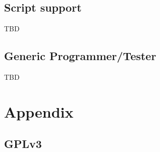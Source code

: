 \documentclass[a4paper,12pt]{book}
\begin{document}
\newpage
\section{Script support}
TBD

\newpage
\section{Generic Programmer/Tester}
TBD

\chapter{Appendix}
\minitoc

\newpage
\section{GPLv3}
\end{document}
